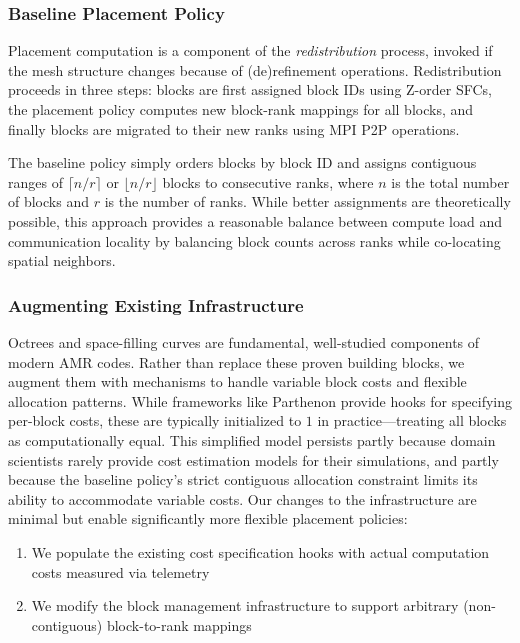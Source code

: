 \subsubsection{Baseline Placement Policy}

Placement computation is a component of the \emph{redistribution} process, invoked if the mesh
structure changes because of (de)refinement operations.
Redistribution proceeds in three steps: blocks are first assigned block IDs using Z-order SFCs, the
placement policy computes new block-rank mappings for all blocks, and finally blocks are migrated
to their new ranks using MPI P2P operations.

The baseline policy simply orders blocks by block ID and assigns contiguous ranges of $\lceil n/r
  \rceil$ or $\lfloor n/r \rfloor$ blocks to consecutive ranks, where $n$ is the total number of
blocks and $r$ is the number of ranks.
While better assignments are theoretically possible, this approach provides a reasonable balance
between compute load and communication locality by balancing block counts across ranks while
co-locating spatial neighbors.

\subsubsection{Augmenting Existing Infrastructure}

Octrees and space-filling curves are fundamental, well-studied components of modern AMR codes.
Rather than replace these proven building blocks, we augment them with mechanisms to handle
variable block costs and flexible allocation patterns.
While frameworks like Parthenon provide hooks for specifying per-block costs, these are typically
initialized to $1$ in practice---treating all blocks as computationally equal.
This simplified model persists partly because domain scientists rarely provide cost estimation
models for their simulations, and partly because the baseline policy's strict contiguous allocation
constraint limits its ability to accommodate variable costs.
Our changes to the infrastructure are minimal but enable significantly more
flexible placement policies:

\begin{enumerate}
  \item We populate the existing cost specification hooks with actual computation costs
        measured via telemetry
  \item We modify the block management infrastructure to support arbitrary
        (non-contiguous) block-to-rank mappings
\end{enumerate}

